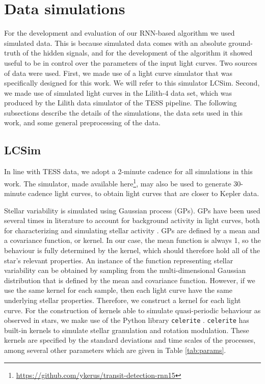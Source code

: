 
\section{Data simulations}

For the development and evaluation of our RNN-based algorithm we used simulated data. This is because simulated data comes with an absolute ground-truth of the hidden signals, and for the development of the algorithm it showed useful to be in control over the parameters of the input light curves. Two sources of data were used. First, we made use of a light curve simulator that was specifically designed for this work. We will refer to this simulator LCSim. Second, we made use of simulated light curves in the Lilith-4 data set, which was produced by the Lilith data simulator of the TESS pipeline. The following subsections describe the details of the simulations, the data sets used in this work, and some general preprocessing of the data.

\subsection{LCSim}
\label{sec:lcsim}

In line with TESS data, we adopt a 2-minute cadence for all simulations in this work. The simulator, made available here\footnote{\url{https://github.com/ykerus/transit-detection-rnn15}}, may also be used to generate 30-minute cadence light curves, to obtain light curves that are closer to Kepler data. 

Stellar variability is simulated using Gaussian process (GPs). GPs have been used several times in literature to account for background activity in light curves, both for characterizing and simulating stellar activity \citep{barros2020improving, zucker2018shallow}. GPs are defined by a mean and a covariance function, or kernel. In our case, the mean function is always 1, so the behaviour is fully determined by the kernel, which should therefore hold all of the star's relevant properties. An instance of the function representing stellar variability can be obtained by sampling from the multi-dimensional Gaussian distribution that is defined by the mean and covariance function. However, if we use the same kernel for each sample, then each light curve have the same underlying stellar properties. Therefore, we construct a kernel for each light curve. For the construction of kernels able to simulate quasi-periodic behaviour as observed in stars, we make use of the Python library \texttt{celerite} \citep{foreman2017fast}. \texttt{celerite} has built-in kernels to simulate stellar granulation and rotation modulation. These kernels are specified by the standard deviations and time scales of the processes, among several other parameters which are given in Table \ref{tab:params}.

